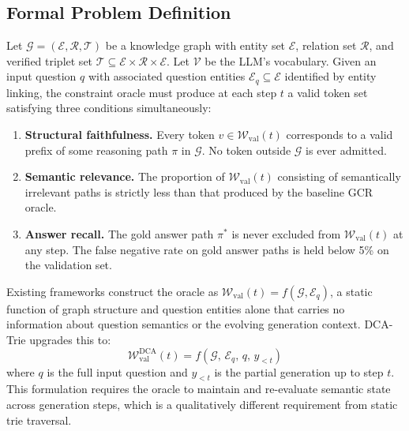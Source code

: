 \subsection{Formal Problem Definition}
\label{sec:oracle:problem}

Let $\mathcal{G} = (\mathcal{E}, \mathcal{R}, \mathcal{T})$ be a knowledge graph with entity set $\mathcal{E}$, relation set $\mathcal{R}$, and verified triplet set $\mathcal{T} \subseteq \mathcal{E} \times \mathcal{R} \times \mathcal{E}$. Let $\mathcal{V}$ be the LLM's vocabulary. Given an input question $q$ with associated question entities $\mathcal{E}_q \subseteq \mathcal{E}$ identified by entity linking, the constraint oracle must produce at each step $t$ a valid token set satisfying three conditions simultaneously:

\begin{enumerate}[label=(\roman*)]
    \item \textbf{Structural faithfulness.} Every token $v \in \mathcal{W}_{\text{val}}(t)$ corresponds to a valid prefix of some reasoning path $\pi$ in $\mathcal{G}$. No token outside $\mathcal{G}$ is ever admitted.

    \item \textbf{Semantic relevance.} The proportion of $\mathcal{W}_{\text{val}}(t)$ consisting of semantically irrelevant paths is strictly less than that produced by the baseline GCR oracle.

    \item \textbf{Answer recall.} The gold answer path $\pi^*$ is never excluded from $\mathcal{W}_{\text{val}}(t)$ at any step. The false negative rate on gold answer paths is held below 5\% on the validation set.
\end{enumerate}

Existing frameworks construct the oracle as $\mathcal{W}_{\text{val}}(t) = f(\mathcal{G}, \mathcal{E}_q)$, a static function of graph structure and question entities alone that carries no information about question semantics or the evolving generation context. DCA-Trie upgrades this to:
\[
    \mathcal{W}_{\text{val}}^{\text{DCA}}(t) = f\!\left(\mathcal{G},\, \mathcal{E}_q,\, q,\, y_{<t}\right)
\]
where $q$ is the full input question and $y_{<t}$ is the partial generation up to step $t$. This formulation requires the oracle to maintain and re-evaluate semantic state across generation steps, which is a qualitatively different requirement from static trie traversal.

